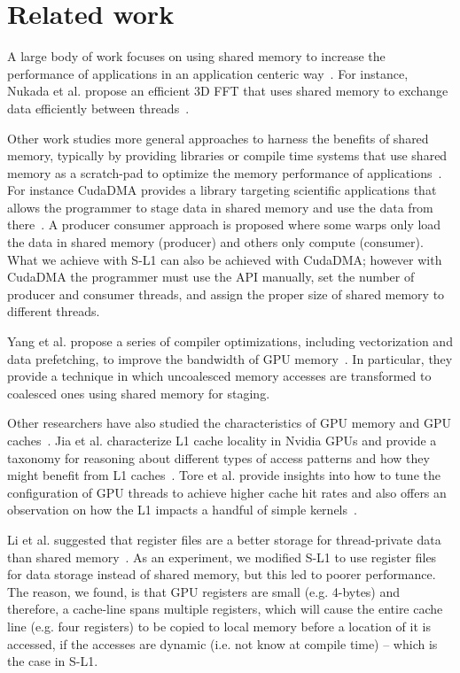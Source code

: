 \section{Related work}
\label{sec:related}

A large body of work focuses on using shared memory to increase the performance of applications in
an application centeric way~\cite{che2009rodinia, Khorasanigpu, lin2010accelerating, suchard2010understanding, tolke2008teraflop, walters2009evaluating}.
For instance, Nukada et al. propose an
efficient 3D FFT that uses shared memory to exchange data efficiently between threads~\cite{fftgpu}.

Other work studies more general approaches to harness the benefits of shared memory, typically by
providing libraries or compile time systems that use shared memory as a scratch-pad to optimize the
memory performance of applications~\cite{Baskaran, ji2011using, Khangpu, moazeni2009memory, ueng2008cuda, YangCompiler}.
For instance CudaDMA provides a library targeting scientific applications that allows the programmer
to stage data in shared memory and use the data from there~\cite{bauer2011cudadma}. A producer
consumer approach is proposed where some warps only load the data in shared memory (producer)
and others only compute (consumer). What we achieve with S-L1 can also be achieved with
CudaDMA; however with CudaDMA the programmer must use the API manually, set the number of
producer and consumer threads, and assign the proper size of shared memory to different threads.

Yang et al. propose a series of compiler optimizations, including vectorization and data
prefetching, to improve the bandwidth of GPU memory~\cite{YangCompiler}. In particular, they provide
a technique in which uncoalesced memory accesses are transformed to coalesced ones using shared
memory for staging.

Other researchers have also studied the characteristics of GPU memory and GPU
caches~\cite{Gaurgpu, wongDomestifying}. Jia et al.
characterize L1 cache locality in Nvidia GPUs and provide a taxonomy for reasoning about
different types of access patterns and how they might benefit from L1
caches~\cite{jia2012characterizing}.
Tore et al. provide insights into how to tune the configuration of GPU threads to achieve higher
cache hit rates and also offers an observation on how the L1 impacts a handful of simple
kernels~\cite{torres2011understanding}.

Li et al. suggested that register files are a better storage for thread-private
data than shared memory~\cite{ispasswork}. As an experiment, we
modified S-L1 to use register files for data storage instead of shared memory, but this led to poorer performance.
The reason, we found, is that GPU registers are small
(e.g. 4-bytes) and therefore, a cache-line spans multiple registers, which will
cause the entire cache line (e.g. four registers) to be copied to local memory
before a location of it is accessed, if the accesses are dynamic (i.e. not know
at compile time) -- which is the case in S-L1.


